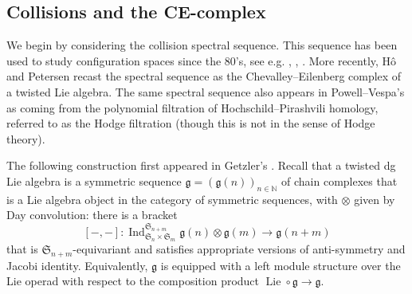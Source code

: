 \documentclass[12pt]{article}
\newcommand{\SymGroup}[1][n]{\mathfrak{S}_{#1}}
\newcommand{\Ind}[2]{\operatorname{Ind}_{#1}^{#2}}
\DeclareMathOperator{\Lie}{Lie}
\theoremstyle{plain}
\theoremstyle{definition}
\theoremstyle{remark}
\begin{document}
\subsection{Collisions and the CE-complex}\label{section:CE-complex}
We begin by considering the collision spectral sequence. This sequence has been used to study configuration spaces since the 80's, see e.g. \cite{CT78}, \cite{Kriz94}, \cite{Tot96}. More recently, Hô \cite{Ho17} and Petersen \cite{Pet20} recast the spectral sequence as the Chevalley--Eilenberg complex of a twisted Lie algebra. The same spectral sequence also appears in Powell--Vespa's \cite{PV18} as coming from the polynomial filtration of Hochschild--Pirashvili homology, referred to as the Hodge filtration (though this is not in the sense of Hodge theory).

The following construction first appeared in Getzler's \cite{Get99}.
Recall that a twisted dg Lie algebra is a symmetric sequence $\mathfrak{g} = (\mathfrak{g}(n))_{n\in \mathbb{N}}$ of chain complexes that is a Lie algebra object in the category of symmetric sequences, with $\otimes$ given by Day convolution: there is a bracket
\[
[-,-]: \Ind{\SymGroup[n]\times\SymGroup[m]}{\SymGroup[n+m]}{\mathfrak{g}(n)\otimes \mathfrak{g}(m)} \to \mathfrak{g}(n+m)
\]
that is $\SymGroup[n+m]$-equivariant and satisfies appropriate versions of anti-symmetry and Jacobi identity. Equivalently, $\mathfrak{g}$ is equipped with a left module structure over the Lie operad with respect to the composition product $\Lie \circ \mathfrak{g} \to \mathfrak{g}$.
\end{document}
